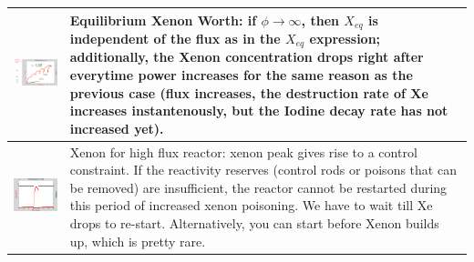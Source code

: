\documentclass{school-22.211-notes}
\begin{document}
\begin{table}
\begin{tabular}{|p{}|p{}|}
%
    \begin{minipage}[b]{0.6\textwidth}
      \includegraphics[width=3.5in]{images/dfs/I-Xe-3.png}
    \end{minipage}
 &  
    \begin{minipage}[b]{0.4\textwidth}    
      Equilibrium Xenon Worth: if $\phi \to \infty$, then $X_{eq}$ is independent of the flux as in the $X_{eq}$ expression; additionally, the Xenon concentration drops right after everytime power increases for the same reason as the previous case (flux increases, the destruction rate of Xe increases instantenously, but the Iodine decay rate has not increased yet). 
    \end{minipage} \\ \hline
%
    \begin{minipage}[b]{0.6\textwidth}
    \includegraphics[width=3.5in]{images/dfs/I-Xe-4.png}
    \end{minipage}
 &  
    \begin{minipage}[b]{0.4\textwidth}
      Xenon for high flux reactor: xenon peak gives rise to a control constraint. If the reactivity reserves (control rods or poisons that can be removed) are insufficient, the reactor cannot be restarted during this period of increased xenon poisoning. We have to wait till Xe drops to re-start. Alternatively, you can start before Xenon builds up, which is pretty rare. 
      \end{minipage} \\ \hline
  \end{tabular}
\end{table}
\end{document}
